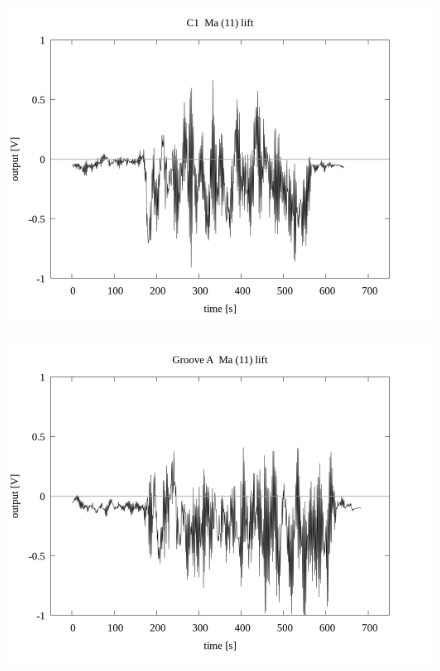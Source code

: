 \documentclass[a4paper]{jsarticle}
\begin{document}
\begin{figure}[htbp]
    \footnotesize
    \begin{center}
        \includegraphics[width=140mm]{../../../33_result/210806/moving_average/11/lift/01/C1_ma(11)_lift_01.png}
    \end{center}
\end{figure}

\begin{figure}[htbp]
    \footnotesize
    \begin{center}
        \includegraphics[width=140mm]{../../../33_result/210806/moving_average/11/lift/01/Groove_A_ma(11)_lift_01.png}
    \end{center}
\end{figure}
\end{document}
